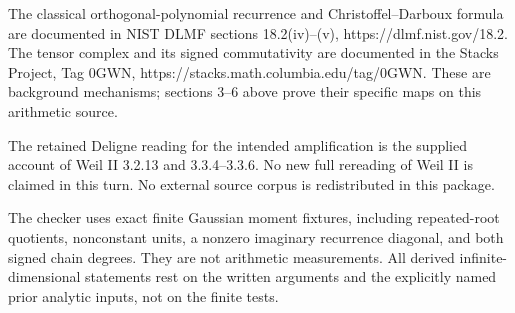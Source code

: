 \documentclass[
]{article}
\begin{document}
The classical orthogonal-polynomial recurrence and Christoffel--Darboux
formula are documented in NIST DLMF sections 18.2(iv)--(v),
https://dlmf.nist.gov/18.2. The tensor complex and its signed
commutativity are documented in the Stacks Project, Tag 0GWN,
https://stacks.math.columbia.edu/tag/0GWN. These are background
mechanisms; sections 3--6 above prove their specific maps on this
arithmetic source.

The retained Deligne reading for the intended amplification is the
supplied account of Weil II 3.2.13 and 3.3.4--3.3.6. No new full
rereading of Weil II is claimed in this turn. No external source corpus
is redistributed in this package.

The checker uses exact finite Gaussian moment fixtures, including
repeated-root quotients, nonconstant units, a nonzero imaginary
recurrence diagonal, and both signed chain degrees. They are not
arithmetic measurements. All derived infinite-dimensional statements
rest on the written arguments and the explicitly named prior analytic
inputs, not on the finite tests.
\end{document}
